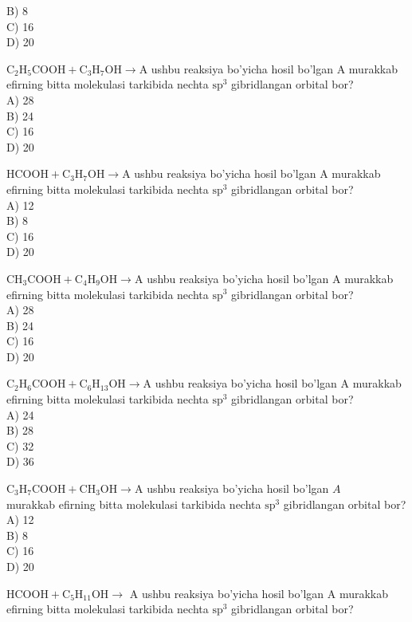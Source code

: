 B) 8\\
C) 16\\
D) 20
  \item $\mathrm{C}_{2} \mathrm{H}_{5} \mathrm{COOH}+\mathrm{C}_{3} \mathrm{H}_{7} \mathrm{OH} \rightarrow \mathrm{A}$ ushbu reaksiya bo'yicha hosil bo'lgan A murakkab efirning bitta molekulasi tarkibida nechta $\mathrm{sp}^{3}$ gibridlangan orbital bor?\\
A) 28\\
B) 24\\
C) 16\\
D) 20
  \item $\mathrm{HCOOH}+\mathrm{C}_{3} \mathrm{H}_{7} \mathrm{OH} \rightarrow \mathrm{A}$ ushbu reaksiya bo'yicha hosil bo'lgan A murakkab efirning bitta molekulasi tarkibida nechta $\mathrm{sp}^{3}$ gibridlangan orbital bor?\\
A) 12\\
B) 8\\
C) 16\\
D) 20
  \item $\mathrm{CH}_{3} \mathrm{COOH}+\mathrm{C}_{4} \mathrm{H}_{9} \mathrm{OH} \rightarrow \mathrm{A}$ ushbu reaksiya bo'yicha hosil bo'lgan A murakkab efirning bitta molekulasi tarkibida nechta $\mathrm{sp}^{3}$ gibridlangan orbital bor?\\
A) 28\\
B) 24\\
C) 16\\
D) 20
  \item $\mathrm{C}_{2} \mathrm{H}_{6} \mathrm{COOH}+\mathrm{C}_{6} \mathrm{H}_{13} \mathrm{OH} \rightarrow \mathrm{A}$ ushbu reaksiya bo'yicha hosil bo'lgan A murakkab efirning bitta molekulasi tarkibida nechta $\mathrm{sp}^{3}$ gibridlangan orbital bor?\\
A) 24\\
B) 28\\
C) 32\\
D) 36
  \item $\mathrm{C}_{3} \mathrm{H}_{7} \mathrm{COOH}+\mathrm{CH}_{3} \mathrm{OH} \rightarrow \mathrm{A}$ ushbu reaksiya bo'yicha hosil bo'lgan $A$\\
murakkab efirning bitta molekulasi tarkibida nechta $\mathrm{sp}^{3}$ gibridlangan orbital bor?\\
A) 12\\
B) 8\\
C) 16\\
D) 20
  \item $\mathrm{HCOOH}+\mathrm{C}_{5} \mathrm{H}_{11} \mathrm{OH} \rightarrow$ A ushbu reaksiya bo'yicha hosil bo'lgan A murakkab efirning bitta molekulasi tarkibida nechta $\mathrm{sp}^{3}$ gibridlangan orbital bor?\\
